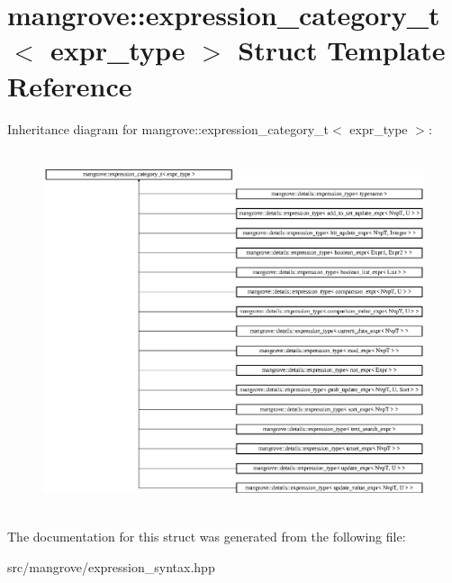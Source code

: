 \hypertarget{structmangrove_1_1expression__category__t}{}\section{mangrove\+:\+:expression\+\_\+category\+\_\+t$<$ expr\+\_\+type $>$ Struct Template Reference}
\label{structmangrove_1_1expression__category__t}
Inheritance diagram for mangrove\+:\+:expression\+\_\+category\+\_\+t$<$ expr\+\_\+type $>$\+:\begin{figure}[H]
\begin{center}
\leavevmode
\includegraphics[height=10.601336cm]{structmangrove_1_1expression__category__t}
\end{center}
\end{figure}


The documentation for this struct was generated from the following file\+:\begin{DoxyCompactItemize}
\item 
src/mangrove/expression\+\_\+syntax.\+hpp\end{DoxyCompactItemize}
